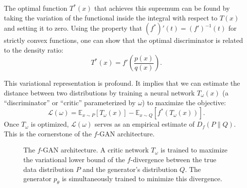 The optimal function $T^*(x)$ that achieves this supremum can be found by taking the variation of the functional inside the integral with respect to $T(x)$ and setting it to zero. Using the property that $(f^*)'(t) = (f')^{-1}(t)$ for strictly convex functions, one can show that the optimal discriminator is related to the density ratio:
\begin{equation}
    T^*(x) = f'\left( \frac{p(x)}{q(x)} \right).
\end{equation}

This variational representation is profound. It implies that we can estimate the distance between two distributions by training a neural network $T_\omega(x)$ (a ``discriminator'' or ``critic'' parameterized by $\omega$) to maximize the objective:
\begin{equation}
    \mathcal{L}(\omega) = \mathbb{E}_{x \sim P}[T_\omega(x)] - \mathbb{E}_{x \sim Q}[f^*(T_\omega(x))].
\end{equation}
Once $T_\omega$ is optimized, $\mathcal{L}(\omega)$ serves as an empirical estimate of $D_f(P \parallel Q)$. This is the cornerstone of the $f$-GAN architecture.

\begin{figure}[htbp]
\centering
{}
\caption{The $f$-GAN architecture. A critic network $T_\omega$ is trained to maximize the variational lower bound of the $f$-divergence between the true data distribution $P$ and the generator's distribution $Q$. The generator $p_\theta$ is simultaneously trained to minimize this divergence.}
\label{fig:fgan_arch}
\end{figure}

